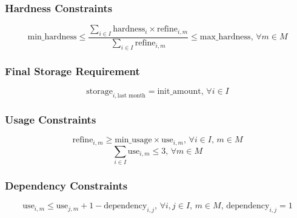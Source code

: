 \documentclass{article}
\begin{document}
\subsubsection*{Hardness Constraints}
\[
\text{min\_hardness} \leq \frac{\sum_{i \in I} \text{hardness}_{i} \times \text{refine}_{i, m}}{\sum_{i \in I} \text{refine}_{i, m}} \leq \text{max\_hardness}, \, \forall m \in M
\]

\subsubsection*{Final Storage Requirement}
\[
\text{storage}_{i, \text{last month}} = \text{init\_amount}, \, \forall i \in I
\]

\subsubsection*{Usage Constraints}
\[
\text{refine}_{i, m} \geq \text{min\_usage} \times \text{use}_{i, m}, \, \forall i \in I, \, m \in M
\]
\[
\sum_{i \in I} \text{use}_{i, m} \leq 3, \, \forall m \in M
\]

\subsubsection*{Dependency Constraints}
\[
\text{use}_{i, m} \leq \text{use}_{j, m} + 1 - \text{dependency}_{i, j}, \, \forall i, j \in I, \, m \in M, \, \text{dependency}_{i, j} = 1
\]
\end{document}
